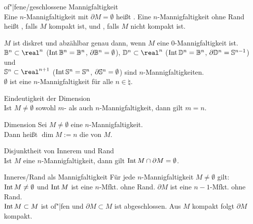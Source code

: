 \begin{Def}{of"|fene/geschlossene Mannigfaltigkeit}\\
    Eine $n$-Mannigfaltigkeit mit $\partial M = \emptyset$ heißt
    .
    Eine $n$-Mannigfaltig\-keit ohne Rand heißt ,
    falls $M$ kompakt ist, und , falls $M$ nicht kompakt ist.
\end{Def}

\begin{Bsp}
    $M$ ist diskret und abzählbar genau dann, wenn $M$ eine
    $0$-Mannigfaltigkeit ist. \\
    $\ball^n \subset \real^n$
    ($\operatorname{Int} \mathbb{B}^n = \mathbb{B}^n$, $\partial \mathbb{B}^n = \emptyset$), \qquad
    $\dball^n \subset \real^n$
    ($\operatorname{Int} \mathbb{D}^n = \mathbb{B}^n$, $\partial \mathbb{D}^n = \mathbb{S}^{n-1}$) und \\
    $\sphere^n \subset \real^{n+1}$
    ($\operatorname{Int} \mathbb{S}^n = \mathbb{S}^n$, $\partial \mathbb{S}^n = \emptyset$)
    sind $n$-Mannigfaltigkeiten. \\
    $\emptyset$ ist eine $n$-Mannigfaltigkeit für alle $n \in \natural$.
\end{Bsp}

\linie

\begin{Satz}{Eindeutigkeit der Dimension}\\
    Ist $M \not= \emptyset$ sowohl $m$- als auch $n$-Mannigfaltigkeit,
    dann gilt $m = n$.
\end{Satz}

\begin{Def}{Dimension}
    Sei $M \not= \emptyset$ eine $n$-Mannigfaltigkeit. \\
    Dann heißt $\dim M := n$ die  von $M$.
\end{Def}

\linie

\begin{Satz}{Disjunktheit von Innerem und Rand}\\
    Ist $M$ eine $n$-Mannigfaltigkeit, dann gilt
    $\operatorname{Int} M \cap \partial M = \emptyset$.
\end{Satz}

\begin{Satz}{Inneres/Rand als Mannigfaltigkeit}
    Für jede $n$-Mannigfaltigkeit $M \not= \emptyset$ gilt: \\
    $\operatorname{Int} M \not= \emptyset$ und $\operatorname{Int} M$ ist eine $n$-Mfkt. ohne Rand.
    $\partial M$ ist eine $n - 1$-Mfkt. ohne Rand. \\
    $\operatorname{Int} M \subset M$ ist of"|fen und
    $\partial M \subset M$ ist abgeschlossen.
    Aus $M$ kompakt folgt $\partial M$ kompakt.
\end{Satz}

